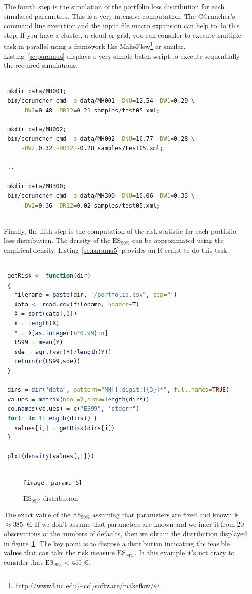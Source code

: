 \documentclass[11pt,fleqn]{book} %
\begin{document}
\begin{example}
	The fourth step is the simulation of the portfolio loss distribution
	for each simulated parameters. This is a very intensive computation.
	The CCruncher's command line execution and the input file macro expansion
	can help to do this step. If you have a cluster, a cloud or grid, you can 
	consider to execute multiple task in parallel using a framework like 
	MakeFlow\footnote{\url{http://www3.nd.edu/~ccl/software/makeflow/}} 
	or similar. Listing~\ref{sc:paramu4} displays a very simple batch
	script to execute sequentially the required simulations.
	\begin{lstlisting}[language=bash, label={sc:paramu4}, 
	caption={Execution of multiple CCrunchers (bash script)}]
 
 mkdir data/MH001;
 bin/ccruncher-cmd -o data/MH001 -DNU=12.54 -DW1=0.29 \
     -DW2=0.48 -DR12=0.21 samples/test05.xml; 
 
 mkdir data/MH002; 
 bin/ccruncher-cmd -o data/MH002 -DNU=10.77 -DW1=0.28 \
     -DW2=0.32 -DR12=-0.28 samples/test05.xml; 

 ...

 mkdir data/MH300; 
 bin/ccruncher-cmd -o data/MH300 -DNU=10.06 -DW1=0.33 \
     -DW2=0.36 -DR12=0.02 samples/test05.xml; 
 
	\end{lstlisting}

	Finally, the fifth step is the computation of the risk statistic
	for each portfolio loss distribution. The density of the $\text{ES}_{99\%}$ 
	can be approximated using the empirical density. Listing~\ref{sc:paramu5}
	provides an R script to do this task. 
	\begin{lstlisting}[language=R, label={sc:paramu5}, 
	caption={$ES_{99\%}$ distribution (R script)}]

 getRisk <- function(dir)
 {
   filename = paste(dir, "/portfolio.csv", sep="")
   data <- read.csv(filename, header=T)
   X = sort(data[,1])
   n = length(X)
   Y = X[as.integer(n*0.99):n]
   ES99 = mean(Y)
   sde = sqrt(var(Y)/length(Y))
   return(c(ES99,sde))
 }

 dirs = dir("data", pattern="MH[[:digit:]{3}]*", full.names=TRUE)
 values = matrix(ncol=2,nrow=length(dirs))
 colnames(values) = c("ES99", "stderr")
 for(i in 1:length(dirs)) {
   values[i,] = getRisk(dirs[i])
 }
 
 plot(density(values[,1]))
 
	\end{lstlisting}
	\begin{figure}[!ht]
		\centering
		\texttt{[image: paramu-5]}
		\caption{$\text{ES}_{99\%}$ distribution}
		\label{fig:paramu5}
	\end{figure}
	The exact value of the $\text{ES}_{99\%}$ assuming that parameters 
	are fixed and known is $\approx 385$\ \euro. If we don't assume that 
	parameters are known and we infer it from 20 observations of the
	numbers of defaults, then we obtain the distribution displayed in
	figure~\ref{fig:paramu5}. 
	The key point is to dispose a distribution indicating the 
	feasible values that can take the risk measure $\text{ES}_{99\%}$.
	In this example it's not crazy to consider that 
	$\text{ES}_{99\%} < 450$ \euro.
\end{example}
\end{document}
